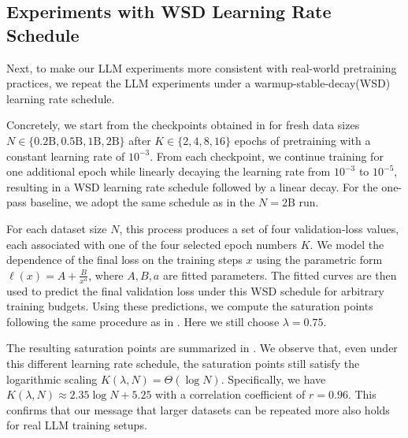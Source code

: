 \subsection{Experiments with WSD Learning Rate Schedule}
\label{app:experiment-llm-lrs}

Next, to make our LLM experiments more consistent with real-world pretraining practices, we repeat the LLM experiments under a warmup-stable-decay(WSD) learning rate schedule.

Concretely, we start from the checkpoints obtained in  for fresh data sizes
$N \in \{0.2\text{B}, 0.5\text{B}, 1\text{B}, 2\text{B}\}$ after $K \in \{2,4,8,16\}$ epochs of pretraining with a constant learning rate of $10^{-3}$. From each checkpoint, we continue training for one additional epoch while linearly decaying the learning rate from $10^{-3}$ to $10^{-5}$, resulting in a WSD learning rate schedule followed by a linear decay. For the one-pass baseline, we adopt the same schedule as in the $N=2\text{B}$ run.

For each dataset size $N$, this process produces a set of four validation-loss values, each associated with one of the four selected epoch numbers $K$. We model the dependence of the final loss on the training steps $x$ using the parametric form  $\ell(x) = A + \frac{B}{x^{a}}$, where $A,B,a$ are fitted parameters. The fitted curves are then used to predict the final validation loss under this WSD schedule for arbitrary training budgets. Using these predictions, we compute the saturation points following the same procedure as in . Here we still choose $\lambda = 0.75$.

The resulting saturation points are summarized in . We observe that, even under this different learning rate schedule, the saturation points still satisfy the logarithmic scaling $K(\lambda,N) = \Theta(\log N).$ Specifically, we have $K(\lambda,N) \approx 2.35 \log N + 5.25$ with a correlation coefficient of $r = 0.96$. This confirms that our message that larger datasets can be repeated more also holds for real LLM training setups.
